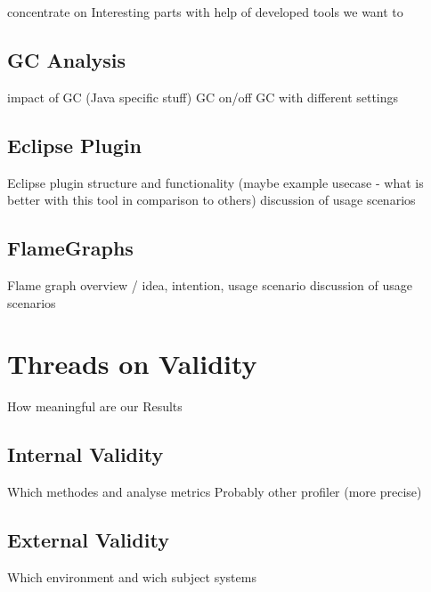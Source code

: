 concentrate on Interesting parts
with help of developed tools we want to

\subsection{GC Analysis}
\label{gc_analysis}

impact of GC (Java specific stuff)
GC on/off
GC with different settings

\subsection{Eclipse Plugin}
\label{eclipse_plugin}

Eclipse plugin structure and functionality (maybe example usecase - what is better with this tool in comparison to others)
discussion of usage scenarios

\subsection{FlameGraphs}
\label{flame_graph}

Flame graph overview / idea, intention, usage scenario
discussion of usage scenarios

\section{Threads on Validity}
\label{validity}
How meaningful are our Results

\subsection{Internal Validity}

Which methodes and analyse metrics
Probably other profiler (more precise)


\subsection{External Validity}

Which environment and wich subject systems
